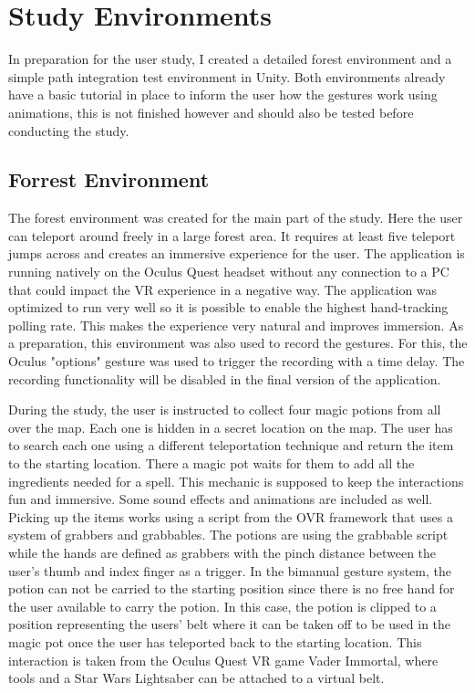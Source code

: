 
\chapter{Study Environments}
In preparation for the user study, I created a detailed forest environment and a simple path integration test environment in Unity. Both environments already have a basic tutorial in place to inform the user how the gestures work using animations, this is not finished however and should also be tested before conducting the study.


\section{Forrest Environment}

The forest environment was created for the main part of the study. Here the user can teleport around freely in a large forest area. It requires at least five teleport jumps across and creates an immersive experience for the user. The application is running natively on the Oculus Quest headset without any connection to a PC that could impact the VR experience in a negative way. The application was optimized to run very well so it is possible to enable the highest hand-tracking polling rate. This makes the experience very natural and improves immersion. As a preparation, this environment was also used to record the gestures. For this, the Oculus "options" gesture was used to trigger the recording with a time delay. The recording functionality will be disabled in the final version of the application. %

During the study, the user is instructed to collect four magic potions from all over the map. Each one is hidden in a secret location on the map. The user has to search each one using a different teleportation technique and return the item to the starting location. There a magic pot waits for them to add all the ingredients needed for a spell. This mechanic is supposed to keep the interactions fun and immersive. Some sound effects and animations are included as well. Picking up the items works using a script from the OVR framework that uses a system of grabbers and grabbables. The potions are using the grabbable script while the hands are defined as grabbers with the pinch distance between the user's thumb and index finger as a trigger. In the bimanual gesture system, the potion can not be carried to the starting position since there is no free hand for the user available to carry the potion. In this case, the potion is clipped to a position representing the users' belt where it can be taken off to be used in the magic pot once the user has teleported back to the starting location. This interaction is taken from the Oculus Quest VR game Vader Immortal, where tools and a Star Wars Lightsaber can be attached to a virtual belt. 

